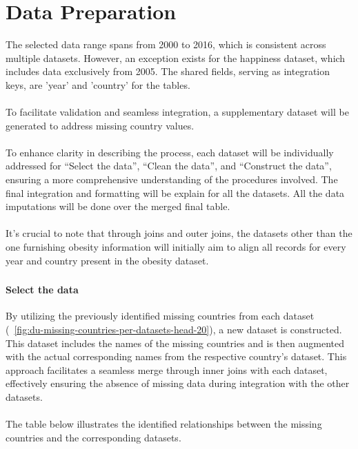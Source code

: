 \part{Data Preparation}
    The selected data range spans from 2000 to 2016, which is consistent across multiple datasets. However, an exception exists for the happiness dataset, which includes data exclusively from 2005. The shared fields, serving as integration keys, are 'year' and 'country' for the tables.
    \\
    \\
    To facilitate validation and seamless integration, a supplementary dataset will be generated to address missing country values.
    \\
    \\
    To enhance clarity in describing the process, each dataset will be individually addressed for “Select the data”, “Clean the data”, and “Construct the data”, ensuring a more comprehensive understanding of the procedures involved. The final integration and formatting will be explain for all the datasets. All the data imputations will be done over the merged final table.
    \\
    \\
    It's crucial to note that through joins and outer joins, the datasets other than the one furnishing obesity information will initially aim to align all records for every year and country present in the obesity dataset.


    \section{\dsMissingCountries}

        \subsection{Select the data}
            By utilizing the previously identified missing countries from each dataset (\figurename~\ref{fig:du-missing-countries-per-datasets-head-20}), a new dataset is constructed. This dataset includes the names of the missing countries and is then augmented with the actual corresponding names from the respective country's dataset. This approach facilitates a seamless merge through inner joins with each dataset, effectively ensuring the absence of missing data during integration with the other datasets.
            \\
            \\
            The table below illustrates the identified relationships between the missing countries and the corresponding datasets.
            \\
            \\

